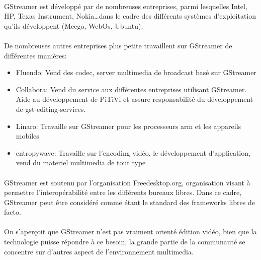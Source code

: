\paragraph{}

GStreamer est développé par de nombreuses entreprises, parmi lesquelles
Intel, HP, Texas Instrument, Nokia\ldots dans le cadre des différents
systèmes d'exploitation qu'ils développent (Meego, WebOs, Ubuntu).

\paragraph{}

De nombreuses autres entreprises plus petite travaillent sur GStreamer
de différentes manières:

\begin{itemize}

  \item {Fluendo: Vend des codec, server multimedia de broadcast basé
  sur GStreamer}

  \item {Collabora: Vend du service aux différentes entreprises utilisant
  GStreamer.
    Aide au développement de PiTiVi et assure responsabilité du
    développement de gst-editing-services.}

  \item {Linaro: Travaille sur GStreamer pour les processeurs arm et
  les appareils mobiles}

  \item {entropywave: Travaille sur l'encoding vidéo, le développement
  d'application, vend du materiel multimedia de tout type}

\end{itemize}

\paragraph{}

GStreamer est soutenu par l'organisation Freedesktop.org, organisation
visant à permettre l'interopérabilité entre les différents bureaux
libres. Dans ce cadre, GStreamer peut être considéré comme étant le
standard des frameworks libres de facto.

\paragraph{}

On s'aperçoit que GStreamer n'est pas vraiment orienté édition vidéo,
bien que la technologie puisse répondre à ce besoin, la grande partie
de la communauté se concentre sur d'autres aspect de l'environnement
multimedia.

